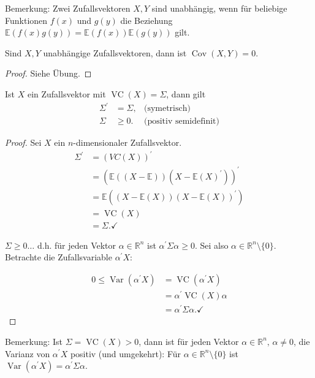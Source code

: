 \documentclass{tstextbook}
\DeclareMathOperator{\Cov}{Cov}
\DeclareMathOperator{\VC}{VC}
\DeclareMathOperator{\Var}{Var}
\newcommand{\R}{\mathbb R}
\begin{document}
\begin{remark}
	Bemerkung: Zwei Zufallsvektoren $ X,Y $ sind unabhängig, wenn für beliebige Funktionen $ f(x) $ und $ g(y) $ die Beziehung $ \mathbb{E}(f(x)g(y))=\mathbb{E}(f(x))\mathbb{E}(g(y)) $ gilt.
\end{remark}

\begin{theorem}
	Sind $ X,Y $ unabhängige Zufallsvektoren, dann ist $ \Cov(X,Y)=0. $
\end{theorem}

\begin{proof}
	Siehe Übung.
\end{proof}

\begin{theorem}
	
	Ist $ X $ ein Zufallsvektor mit $ \VC(X)=\Sigma $, dann gilt 
	\[\begin{aligned}
	\Sigma^\prime &=\Sigma, & \text{(symetrisch)} \\
	\Sigma & \ge0. & \text{(positiv semidefinit)}
	\end{aligned}
	\] 
	
\end{theorem}

\begin{proof}
	Sei $ X $ ein $n$-dimensionaler Zufallsvektor. 
	\begin{align*}
	\Sigma^\prime &=(VC(X))^\prime \\
	& = (\mathbb{E}((X-\mathbb{E}))(X-\mathbb{E}(X)^\prime))^\prime \\
	& = \mathbb{E}((X-\mathbb{E}(X))(X-\mathbb{E}(X))^\prime)\\
	& = \VC(X)\\
	& = \Sigma.\checkmark
\end{align*}

$ \Sigma\ge0\ldots $ d.h. für jeden Vektor $ \alpha\in\mathbb{R}^n $ ist $ \alpha^\prime\Sigma\alpha\ge0. $
Sei also $ \alpha\in\mathbb{R}^n\setminus\{0\}. $ Betrachte die Zufallsvariable $ \alpha^\prime X: $

\begin{align*}	
	0 \le \Var(\alpha^\prime X) & = \VC(\alpha^\prime X) \\
	&= \alpha^\prime \VC(X)\alpha\\
	&= \alpha^\prime\Sigma\alpha.\checkmark	
\end{align*}	

\end{proof}

\begin{remark}
	Bemerkung: Ist $ \Sigma = \VC(X) > 0 $, dann ist für jeden Vektor $ \alpha \in \R^n, \, \alpha \ne 0 $, die Varianz von $ \alpha^\prime X $ positiv (und umgekehrt): 
	Für $ \alpha \in \R^n\setminus\{0\} $ ist $ \Var(\alpha^\prime X) = \alpha^\prime \Sigma \alpha $.
\end{remark}
\end{document}
